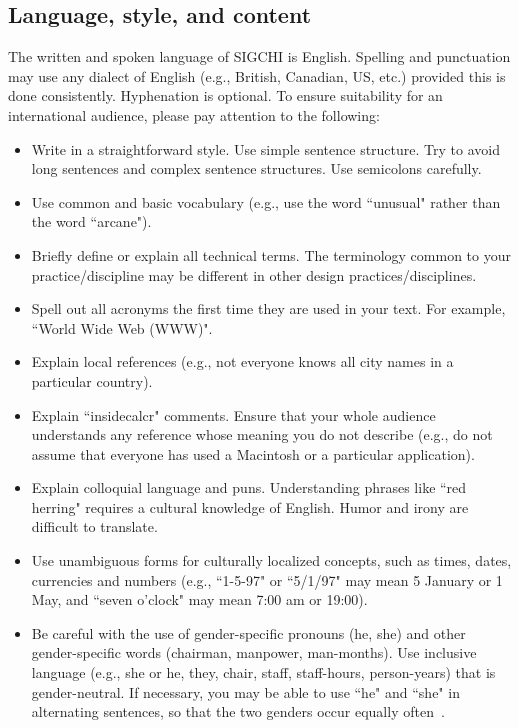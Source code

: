 \documentclass{chi-ext}
\begin{document}
\subsection{Language, style, and content}
The written and spoken language of SIGCHI is English. 
Spelling and punctuation may use any dialect of English (e.g., British, Canadian, US, etc.) provided this is done consistently. 
Hyphenation is optional. 
To ensure suitability for an international audience, please pay attention to the following:

\begin{itemize}\compresslist
\item   
Write in a straightforward style. 
Use simple sentence structure. 
Try to avoid long sentences and complex sentence structures. 
Use semicolons carefully.
\item   
Use common and basic vocabulary (e.g., use the word ``unusual" rather than the word ``arcane").
\item   
Briefly define or explain all technical terms. 
The terminology common to your practice/discipline may be different in other design practices/disciplines.
\item   
Spell out all acronyms the first time they are used in your text. 
For example, ``World Wide Web (WWW)".
\item   
Explain local references (e.g., not everyone knows all city names in a particular country).
\item   
Explain ``insidecalcr" comments. 
Ensure that your whole audience understands any reference whose meaning you do not describe (e.g., do not assume that everyone has used a Macintosh or a particular application).
\item   
Explain colloquial language and puns. 
Understanding phrases like ``red herring" requires a cultural knowledge of English. 
Humor and irony are difficult to translate.
\item   
Use unambiguous forms for culturally localized concepts, such as times, dates, currencies and numbers (e.g., ``1-5-97" or ``5/1/97" may mean 5 January or 1 May, and ``seven o'clock" may mean 7:00 am or 19:00).
\item   
Be careful with the use of gender-specific pronouns (he, she) and other gender-specific words (chairman, manpower, man-months). 
Use inclusive language (e.g., she or he, they, chair, staff, staff-hours, person-years) that is gender-neutral. 
If necessary, you may be able to use ``he" and ``she" in alternating sentences, so that the two genders occur equally often~\cite{Schwartz95}. 
\end{itemize}
\end{document}
